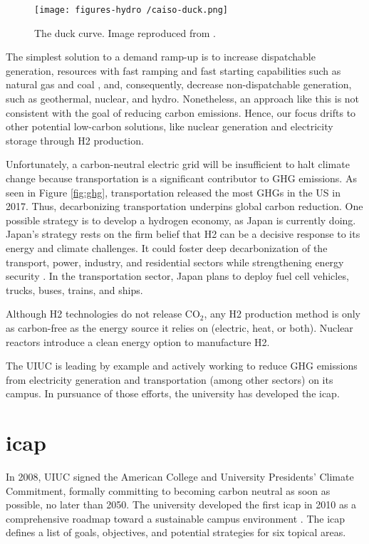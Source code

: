 \documentclass[11pt,letterpaper]{article}
\begin{document}
\begin{figure}[htbp!]
	\centering
	\texttt{[image: figures-hydro /caiso-duck.png]}
	\hfill
	\caption{The duck curve. Image reproduced from \cite{bouillon_prepared_2014}.}
	\label{fig:duck}
\end{figure}

The simplest solution to a demand ramp-up is to increase dispatchable generation, resources with fast ramping and fast starting capabilities such as natural gas and coal \cite{bouillon_prepared_2014}, and, consequently, decrease non-dispatchable generation, such as geothermal, nuclear, and hydro.
Nonetheless, an approach like this is not consistent with the goal of reducing carbon emissions.
Hence, our focus drifts to other potential low-carbon solutions, like nuclear generation and electricity storage through \gls{H2} production.

Unfortunately, a carbon-neutral electric grid will be insufficient to halt climate change because transportation is a significant contributor to \gls{GHG} emissions.
As seen in Figure \ref{fig:ghg}, transportation released the most \glspl{GHG} in the \gls{US} in 2017. Thus, decarbonizing transportation underpins global carbon reduction.
One possible strategy is to develop a hydrogen economy, as Japan is currently doing.
Japan's strategy rests on the firm belief that \gls{H2} can be a decisive response to its energy and climate challenges.
It could foster deep decarbonization of the transport, power, industry, and residential sectors while strengthening energy security \cite{nagashima_japans_2018}.
In the transportation sector, Japan plans to deploy fuel cell vehicles, trucks, buses, trains, and ships.

Although \gls{H2} technologies do not release CO$_2$, any \gls{H2} production method is only as carbon-free as the energy source it relies on (electric, heat, or both).
Nuclear reactors introduce a clean energy option to manufacture \gls{H2}.

The \gls{UIUC} is leading by example and actively working to reduce \gls{GHG} emissions from electricity generation and transportation (among other sectors) on its campus.
In pursuance of those efforts, the university has developed the \gls{icap}.

\section{\gls{icap}}
In 2008, \gls{UIUC} signed the American College and University Presidents' Climate Commitment, formally committing to becoming carbon neutral as soon as possible, no later than 2050.
The university developed the first \gls{icap} in 2010 as a comprehensive roadmap toward a sustainable campus environment \cite{university_of_illinois_at_urbana-champaign_illlinois_2015}.
The \gls{icap} defines a list of goals, objectives, and potential strategies for six topical areas.
\end{document}
